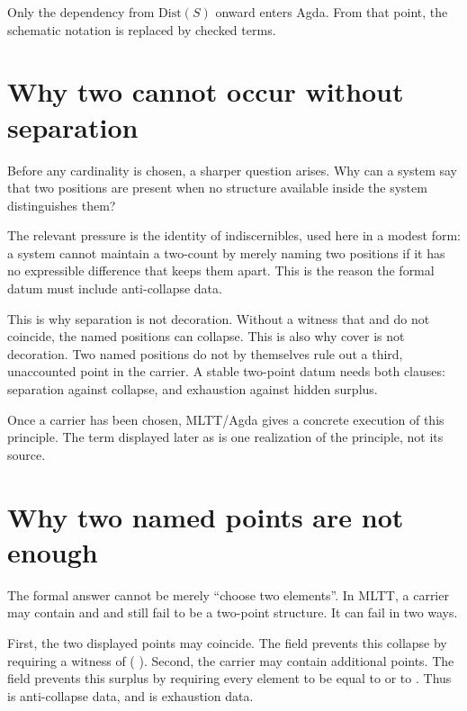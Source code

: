 \documentclass[11pt]{article}
\begin{document}
Only the dependency from \(\mathrm{Dist}(S)\) onward enters Agda.  From
that point, the schematic notation is replaced by checked terms.

\section*{Why two cannot occur without separation}

Before any cardinality is chosen, a sharper question arises.  Why can a
system say that two positions are present when no structure available
inside the system distinguishes them?

The relevant pressure is the identity of indiscernibles, used here in a
modest form: a system cannot maintain a two-count by merely naming two
positions if it has no expressible difference that keeps them apart.
This is the reason the formal datum must include anti-collapse data.

This is why separation is not decoration.  Without a witness that
 and  do not coincide, the named
positions can collapse.  This is also why cover is not decoration.  Two
named positions do not by themselves rule out a third, unaccounted point
in the carrier.  A stable two-point datum needs both clauses: separation
against collapse, and exhaustion against hidden surplus.

Once a carrier has been chosen, MLTT/Agda gives a concrete execution of
this principle.  The term displayed later as
 is one realization of
the principle, not its source.

\section*{Why two named points are not enough}

The formal answer cannot be merely ``choose two elements''.  In MLTT, a
carrier may contain  and  and still fail
to be a two-point structure.  It can fail in two ways.

First, the two displayed points may coincide.  The field
 prevents this collapse by requiring a witness of
\AgdaSymbol{\ensuremath{\neg}} (
\AgdaSymbol{\ensuremath{\equiv}} ).  Second, the
carrier may contain additional points.  The field 
prevents this surplus by requiring every element to be equal to
 or to .  Thus 
is anti-collapse data, and  is exhaustion data.
\end{document}
